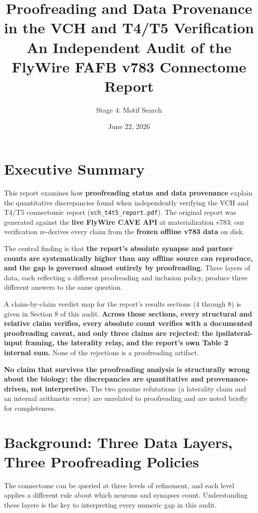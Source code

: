 \documentclass[11pt]{article}
\title{\vspace{-2em}Proofreading and Data Provenance in the VCH and T4/T5 Verification\\
\large An Independent Audit of the FlyWire FAFB v783 Connectome Report}
\author{Stage 4: Motif Search}
\date{June 22, 2026}
\newcommand{\key}[1]{\textbf{#1}}
\begin{document}
\maketitle
\vspace{-1.5em}

\section*{Executive Summary}

This report examines how \key{proofreading status and data provenance} explain the
quantitative discrepancies found when independently verifying the VCH and T4/T5
connectomic report (\texttt{vch\_t4t5\_report.pdf}). The original report was generated
against the \key{live FlyWire CAVE API} at materialization v783; our verification
re-derives every claim from the \key{frozen offline v783 data} on disk.

The central finding is that \key{the report's absolute synapse and partner counts are
systematically higher than any offline source can reproduce, and the gap is governed
almost entirely by proofreading.} Three layers of data, each reflecting a different
proofreading and inclusion policy, produce three different answers to the same question.

A claim-by-claim verdict map for the report's results sections (4 through 8) is given in
Section 8 of this audit. \key{Across those sections, every structural and relative claim
verifies, every absolute count verifies with a documented proofreading caveat, and only
three claims are rejected: the ipsilateral-input framing, the laterality relay, and the
report's own Table 2 internal sum.} None of the rejections is a proofreading artifact.

\key{No claim that survives the proofreading analysis is structurally wrong about the
biology; the discrepancies are quantitative and provenance-driven, not interpretive.}
The two genuine refutations (a laterality claim and an internal arithmetic error) are
unrelated to proofreading and are noted briefly for completeness.

\section{Background: Three Data Layers, Three Proofreading Policies}

The connectome can be queried at three levels of refinement, and each level applies a
different rule about which neurons and synapses count. Understanding these layers is the
key to interpreting every numeric gap in this audit.
\end{document}
